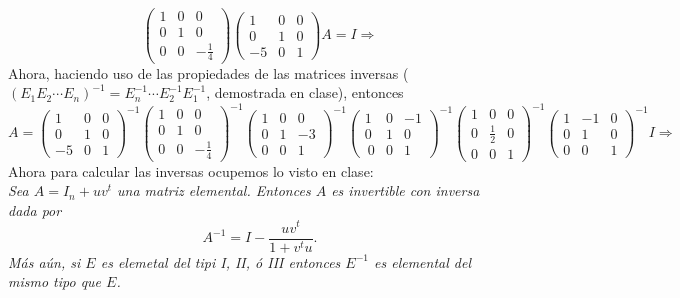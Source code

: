 \documentclass[11pt,letterpaper]{article}
\begin{document}
\begin{enumerate}
\begin{equation*}
\begin{pmatrix}
 1 & 0 & 0\\
 0 & 1 & 0\\
 0 & 0 & -\frac{1}{4}
\end{pmatrix}
\begin{pmatrix}
 1 & 0 & 0\\
 0 & 1 & 0\\
-5 & 0 & 1
\end{pmatrix}A=I \Rightarrow
\end{equation*}
Ahora, haciendo uso de las propiedades de las matrices inversas ($(E_1E_2\cdots E_n)^{-1}=E_n^{-1}\cdots E_2^{-1}E_1^{-1}$, demostrada en clase), entonces
\begin{equation*}
A=\begin{pmatrix}
 1 & 0 & 0\\
 0 & 1 & 0\\
-5 & 0 & 1
\end{pmatrix}^{-1}\begin{pmatrix}
 1 & 0 & 0\\
 0 & 1 & 0\\
 0 & 0 & -\frac{1}{4}
\end{pmatrix}^{-1}\begin{pmatrix}
 1 & 0 & 0\\
 0 & 1 & -3\\
 0 & 0 & 1
\end{pmatrix}^{-1}
\begin{pmatrix}
 1 & 0 & -1\\
 0 & 1 & 0\\\
 0 & 0 & 1
\end{pmatrix}^{-1}
\begin{pmatrix}
 1 & 0 & 0\\
 0 & \frac{1}{2} & 0\\
 0 & 0 & 1
\end{pmatrix}^{-1}\begin{pmatrix}
 1 &-1 & 0\\
 0 & 1 & 0\\
 0 & 0 & 1
\end{pmatrix}^{-1}I \Rightarrow 
\end{equation*}
Ahora para calcular las inversas ocupemos lo visto en clase:\\
\textit{Sea $A=I_n+uv^t$ una matriz elemental. Entonces $A$ es invertible con inversa dada por
$$A^{-1}=I-\frac{uv^t}{1+v^tu}.$$ 
Más aún, si $E$ es elemetal del tipi I, II, ó III entonces $E^{-1}$ es elemental del mismo tipo que $E$.}


\end{enumerate}
\end{document}
